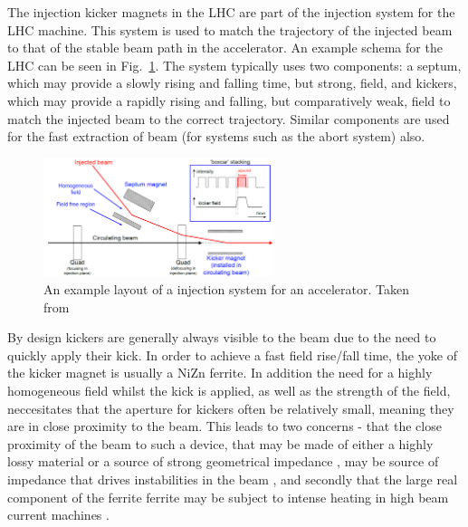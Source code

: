 The injection kicker magnets in the LHC are part of the injection system for the LHC machine. This system is used to match the trajectory of the injected beam to that of the stable beam path in the accelerator. An example schema for the LHC can be seen in Fig.~\ref{fig:injection-system-schema}. The system typically uses two components: a septum, which may provide a slowly rising and falling time, but strong, field, and kickers, which may provide a rapidly rising and falling, but comparatively weak, field to match the injected beam to the correct trajectory. Similar components are used for the fast extraction of beam (for systems such as the abort system) also.

\begin{figure}
\begin{center}
\includegraphics[width=0.6\textwidth]{LHC_MKI/figures/injection-system.png}
\end{center}
\caption{An example layout of a injection system for an accelerator. Taken from \cite{Barnes:injSys}}
\label{fig:injection-system-schema}
\end{figure}

By design kickers are generally always visible to the beam due to the need to quickly apply their kick. In order to achieve a fast field rise/fall time, the yoke of the kicker magnet is usually a NiZn ferrite. In addition the need for a highly homogeneous field whilst the kick is applied, as well as the strength of the field, neccesitates that the aperture for kickers often be relatively small, meaning they are in close proximity to the beam. This leads to two concerns - that the close proximity of the beam to such a device, that may be made of either a highly lossy material \cite{Day:wireMeasFerr, Barnes:wireMeasKick, Barnes:spsKickerHeating} or a source of strong geometrical impedance \cite{Belver-Aguilar:clicStripline}, may be source of impedance that drives instabilities in the beam \cite{Salvant:spsImpModel}, and secondly that the large real component of the ferrite ferrite may be subject to intense heating in high beam current machines \cite{Barnes:spsKickerHeating}. 


